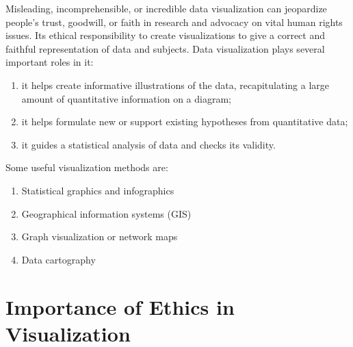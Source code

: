 \documentclass[]{book}
\providecommand{\tightlist}{%
  \setlength{\itemsep}{0pt}\setlength{\parskip}{0pt}}
\theoremstyle{definition}
\theoremstyle{definition}
\theoremstyle{definition}
\theoremstyle{remark}
\begin{document}
Misleading, incomprehensible, or incredible data visualization can
jeopardize people's trust, goodwill, or faith in research and advocacy
on vital human rights issues. Its ethical responsibility to create
visualizations to give a correct and faithful representation of data and
subjects. Data visualization plays several important roles in it:

\begin{enumerate}
\def\labelenumi{\arabic{enumi}.}
\tightlist
\item
  it helps create informative illustrations of the data, recapitulating
  a large amount of quantitative information on a diagram;
\item
  it helps formulate new or support existing hypotheses from
  quantitative data;
\item
  it guides a statistical analysis of data and checks its validity.
\end{enumerate}

Some useful visualization methods are:

\begin{enumerate}
\def\labelenumi{\arabic{enumi}.}
\tightlist
\item
  Statistical graphics and infographics
\item
  Geographical information systems (GIS)
\item
  Graph visualization or network maps
\item
  Data cartography
\end{enumerate}

\section{Importance of Ethics in
Visualization}\label{importance-of-ethics-in-visualization}

\citep{ethical_infographics}
\end{document}
